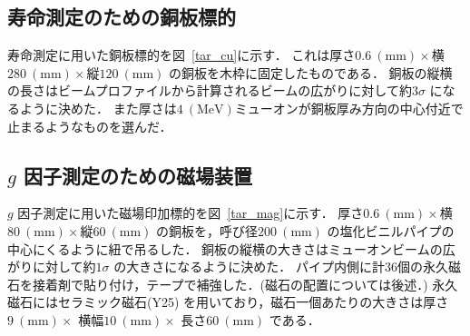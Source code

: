  



%

\subsection{寿命測定のための銅板標的}
寿命測定に用いた銅板標的を図~\ref{tar_cu}に示す．
これは厚さ$0.6~(\mathrm{mm})\times$横$280~(\mathrm{mm})\times$縦$120~(\mathrm{mm})$ の銅板を木枠に固定したものである．
銅板の縦横の長さはビームプロファイルから計算されるビームの広がりに対して約$3\sigma$ になるように決めた．
また厚さは$4~(\mathrm{MeV}) $ミューオンが銅板厚み方向の中心付近で止まるようなものを選んだ．
\subsection{$g$ 因子測定のための磁場装置}
$g$ 因子測定に用いた磁場印加標的を図~\ref{tar_mag}に示す．
厚さ$0.6~(\mathrm{mm})\times$横$80~(\mathrm{mm})\times$縦$60~(\mathrm{mm})$ の銅板を，呼び径$200~(\mathrm{mm})$ の塩化ビニルパイプの中心にくるように紐で吊るした．
銅板の縦横の大きさはミューオンビームの広がりに対して約$1\sigma$ の大きさになるように決めた．
パイプ内側に計36個の永久磁石を接着剤で貼り付け，テープで補強した．(磁石の配置については後述．)
永久磁石にはセラミック磁石(Y25) を用いており，磁石一個あたりの大きさは厚さ$9~(\mathrm{mm})\times$ 横幅$10~(\mathrm{mm})\times$ 長さ$60~(\mathrm{mm})$ である．

